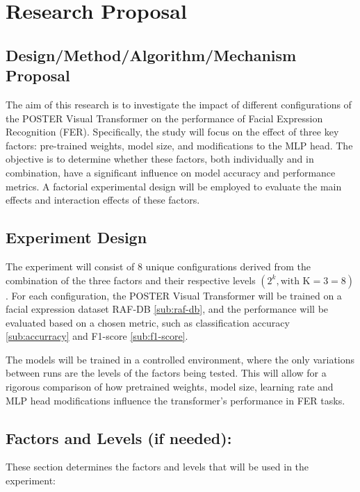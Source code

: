 \chapter{Research Proposal}
\label{chapter:research-proposal}

\section{Design/Method/Algorithm/Mechanism Proposal}

The aim of this research is to investigate the impact of different configurations of the POSTER Visual Transformer on the performance of Facial Expression Recognition (FER). Specifically, the study will focus on the effect of three key factors: pre-trained weights, model size, and modifications to the MLP head. The objective is to determine whether these factors, both individually and in combination, have a significant influence on model accuracy and performance metrics. A factorial experimental design will be employed to evaluate the main effects and interaction effects of these factors.
 

\section{Experiment Design}
\label{section:experiment-design}
The experiment will consist of 8 unique configurations derived from the combination of the three factors and their respective levels $(2^k, \text{with K} = 3 = 8)$. For each configuration, the POSTER Visual Transformer will be trained on a facial expression dataset RAF-DB \ref{sub:raf-db}, and the performance will be evaluated based on a chosen metric, such as classification accuracy \ref{sub:accurracy} and F1-score \ref{sub:f1-score}.

The models will be trained in a controlled environment, where the only variations between runs are the levels of the factors being tested. This will allow for a rigorous comparison of how pretrained weights, model size, learning rate and MLP head modifications influence the transformer’s performance in FER tasks.

\section{Factors and Levels (if needed):}
These section determines the  factors and levels that will be used in the experiment:


